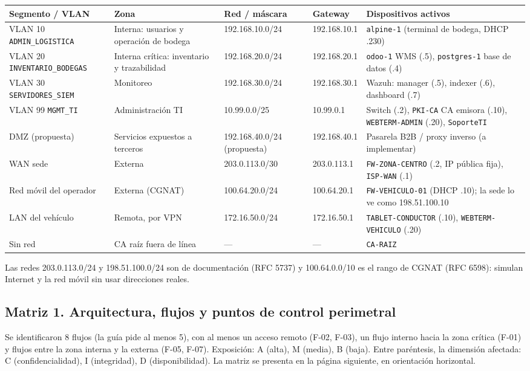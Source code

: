 \documentclass[11pt,a4paper]{article}
\newcommand{\cd}[1]{\texttt{#1}}
\begin{document}
{\small
\setlength{\tabcolsep}{3pt}
\begin{longtable}{@{}P{3.4cm}P{2.4cm}P{2.3cm}P{1.9cm}P{4.0cm}@{}}
\toprule
\textbf{Segmento / VLAN} & \textbf{Zona} & \textbf{Red / máscara} & \textbf{Gateway} & \textbf{Dispositivos activos} \\ \midrule
\endhead
VLAN 10 \cd{ADMIN\_\allowbreak LOGISTICA} & Interna: usuarios y operación de bodega & 192.168.10.0/24 & 192.168.10.1 & \cd{alpine-1} (terminal de bodega, DHCP .230) \\
VLAN 20 \cd{INVENTARIO\_\allowbreak BODEGAS} & Interna crítica: inventario y trazabilidad & 192.168.20.0/24 & 192.168.20.1 & \cd{odoo-1} WMS (.5), \cd{postgres-1} base de datos (.4) \\
VLAN 30 \cd{SERVIDORES\_\allowbreak SIEM} & Monitoreo & 192.168.30.0/24 & 192.168.30.1 & Wazuh: manager (.5), indexer (.6), dashboard (.7) \\
VLAN 99 \cd{MGMT\_TI} & Administración TI & 10.99.0.0/25 & 10.99.0.1 & Switch (.2), \cd{PKI-CA} CA emisora (.10), \cd{WEBTERM-ADMIN} (.20), \cd{SoporteTI} \\
DMZ (propuesta) & Servicios expuestos a terceros & 192.168.40.0/24 (propuesta) & 192.168.40.1 & Pasarela B2B / proxy inverso (a implementar) \\
WAN sede & Externa & 203.0.113.0/30 & 203.0.113.1 & \cd{FW-ZONA-CENTRO} (.2, IP pública fija), \cd{ISP-WAN} (.1) \\
Red móvil del operador & Externa (CGNAT) & 100.64.20.0/24 & 100.64.20.1 & \cd{FW-VEHICULO-01} (DHCP .10); la sede lo ve como 198.51.100.10 \\
LAN del vehículo & Remota, por VPN & 172.16.50.0/24 & 172.16.50.1 & \cd{TABLET-CONDUCTOR} (.10), \cd{WEBTERM-VEHICULO} (.20) \\
Sin red & CA raíz fuera de línea & — & — & \cd{CA-RAIZ} \\ \bottomrule
\end{longtable}
}

Las redes 203.0.113.0/24 y 198.51.100.0/24 son de documentación (RFC 5737) y 100.64.0.0/10 es el rango de CGNAT (RFC 6598): simulan Internet y la red móvil sin usar direcciones reales.

\subsection{Matriz 1. Arquitectura, flujos y puntos de control perimetral}

Se identificaron 8 flujos (la guía pide al menos 5), con al menos un acceso remoto (F-02, F-03), un flujo interno hacia la zona crítica (F-01) y flujos entre la zona interna y la externa (F-05, F-07). Exposición: A (alta), M (media), B (baja). Entre paréntesis, la dimensión afectada: C (confidencialidad), I (integridad), D (disponibilidad). La matriz se presenta en la página siguiente, en orientación horizontal.
\end{document}
